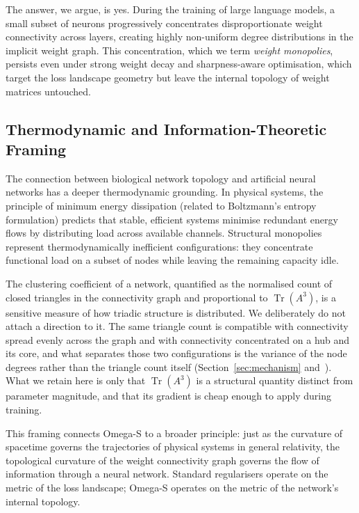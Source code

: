 \documentclass[11pt,a4paper]{article}
\begin{document}
The answer, we argue, is yes. During the training of large language models,
a small subset of neurons progressively concentrates disproportionate weight
connectivity across layers, creating highly non-uniform degree distributions
in the implicit weight graph. This concentration, which we term
\emph{weight monopolies}, persists even under strong weight decay and
sharpness-aware optimisation, which target the loss landscape geometry but
leave the internal topology of weight matrices untouched.

\subsection{Thermodynamic and Information-Theoretic Framing}

The connection between biological network topology and artificial neural
networks has a deeper thermodynamic grounding. In physical systems, the
principle of minimum energy dissipation (related to Boltzmann's entropy
formulation) predicts that stable, efficient systems minimise redundant
energy flows by distributing load across available channels. Structural
monopolies represent thermodynamically inefficient configurations: they
concentrate functional load on a subset of nodes while leaving the remaining
capacity idle.

The clustering coefficient of a network, quantified as the normalised
count of closed triangles in the connectivity graph and proportional to
$\operatorname{Tr}(A^3)$, is a sensitive measure of how triadic structure is
distributed. We deliberately do not attach a direction to it. The same
triangle count is compatible with connectivity spread evenly across the graph
and with connectivity concentrated on a hub and its core, and what separates
those two configurations is the variance of the node degrees rather than the
triangle count itself (Section~\ref{sec:mechanism} and~\cite{acedo2026fsri}).
What we retain here is only that $\operatorname{Tr}(A^3)$ is a structural
quantity distinct from parameter magnitude, and that its gradient is cheap
enough to apply during training.

This framing connects Omega-S to a broader principle: just as the curvature
of spacetime governs the trajectories of physical systems in general
relativity, the topological curvature of the weight connectivity graph
governs the flow of information through a neural network. Standard
regularisers operate on the metric of the loss landscape; Omega-S operates
on the metric of the network's internal topology.
\end{document}
